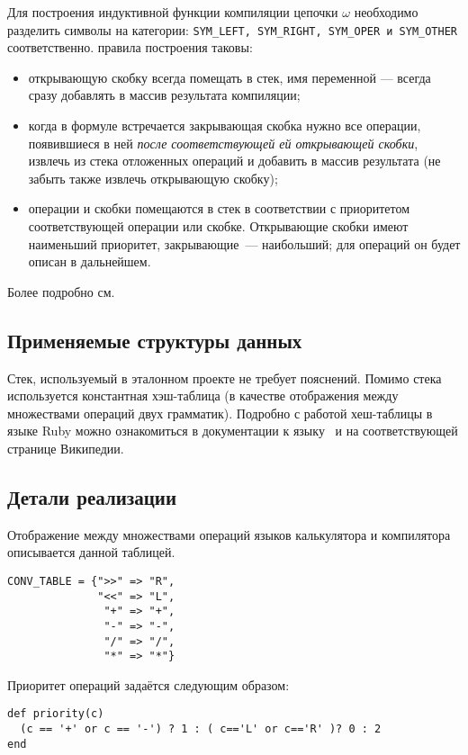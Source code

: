 Для построения индуктивной функции компиляции цепочки $\omega$ необходимо разделить
символы на категории: \verb|SYM_LEFT, SYM_RIGHT, SYM_OPER и SYM_OTHER| соответственно.
правила построения таковы:
\begin{itemize}
  \item открывающую скобку всегда помещать в стек, имя переменной --- всегда
  сразу добавлять в массив результата компиляции;
  \item когда в формуле встречается закрывающая скобка нужно все операции,
  появившиеся в ней \emph{после соответствующей ей открывающей скобки}, извлечь
  из стека отложенных операций и добавить в массив результата
  (не забыть также извлечь открывающую скобку);
  \item операции и скобки помещаются в стек в соответствии с приоритетом
  соответствующей операции или скобке. Открывающие скобки имеют наименьший приоритет,
  закрывающие~--- наибольший; для операций он будет описан в дальнейшем.
\end{itemize}
Более подробно см. \cite{compf}

\subsection{Применяемые структуры данных}
Стек, используемый в эталонном проекте не требует пояснений.
Помимо стека используется константная хэш-таблица (в качестве отображения
между множествами операций двух грамматик). Подробно с работой хеш-таблицы в языке
Ruby можно ознакомиться в документации к языку~\cite{rubydoc} и на соответствующей
странице Википедии.

\subsection{Детали реализации}

Отображение между множествами операций языков калькулятора и компилятора описывается
данной таблицей.
\begin{lstlisting}
CONV_TABLE = {">>" => "R",
              "<<" => "L",
               "+" => "+",
               "-" => "-",
               "/" => "/",
               "*" => "*"}
\end{lstlisting}

Приоритет операций задаётся следующим образом:
\begin{lstlisting}
def priority(c)
  (c == '+' or c == '-') ? 1 : ( c=='L' or c=='R' )? 0 : 2
end
\end{lstlisting}

